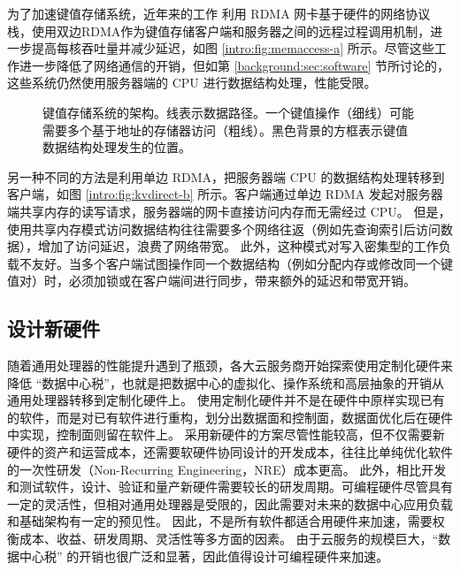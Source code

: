 为了加速键值存储系统，近年来的工作 \cite {kalia2014using,kalia2016design,kalia2014using,kalia2016design} 利用 RDMA 网卡基于硬件的网络协议栈，使用双边RDMA作为键值存储客户端和服务器之间的远程过程调用机制，进一步提高每核吞吐量并减少延迟，如图 \ref{intro:fig:memaccess-a} 所示。尽管这些工作进一步降低了网络通信的开销，但如第 \ref{background:sec:software} 节所讨论的，这些系统仍然使用服务器端的 CPU 进行数据结构处理，性能受限。


\begin{figure}[t]
	\centering
	\caption{键值存储系统的架构。线表示数据路径。一个键值操作（细线）可能需要多个基于地址的存储器访问（粗线）。黑色背景的方框表示键值数据结构处理发生的位置。}
	\label{intro:fig:kvdirect}
\end{figure}

另一种不同的方法是利用单边 RDMA，把服务器端 CPU 的数据结构处理转移到客户端，如图 \ref{intro:fig:kvdirect-b} 所示。客户端通过单边 RDMA 发起对服务器端共享内存的读写请求，服务器端的网卡直接访问内存而无需经过 CPU。
但是，使用共享内存模式访问数据结构往往需要多个网络往返（例如先查询索引后访问数据），增加了访问延迟，浪费了网络带宽。
此外，这种模式对写入密集型的工作负载不友好。当多个客户端试图操作同一个数据结构（例如分配内存或修改同一个键值对）时，必须加锁或在客户端间进行同步，带来额外的延迟和带宽开销。

\subsection{设计新硬件}

随着通用处理器的性能提升遇到了瓶颈，各大云服务商开始探索使用定制化硬件来降低 ``数据中心税''，也就是把数据中心的虚拟化、操作系统和高层抽象的开销从通用处理器转移到定制化硬件上。
使用定制化硬件并不是在硬件中原样实现已有的软件，而是对已有软件进行重构，划分出数据面和控制面，数据面优化后在硬件中实现，控制面则留在软件上。
采用新硬件的方案尽管性能较高，但不仅需要新硬件的资产和运营成本，还需要软硬件协同设计的开发成本，往往比单纯优化软件的一次性研发（Non-Recurring Engineering，NRE）成本更高。
此外，相比开发和测试软件，设计、验证和量产新硬件需要较长的研发周期。可编程硬件尽管具有一定的灵活性，但相对通用处理器是受限的，因此需要对未来的数据中心应用负载和基础架构有一定的预见性。
因此，不是所有软件都适合用硬件来加速，需要权衡成本、收益、研发周期、灵活性等多方面的因素。
由于云服务的规模巨大，``数据中心税'' 的开销也很广泛和显著，因此值得设计可编程硬件来加速。

